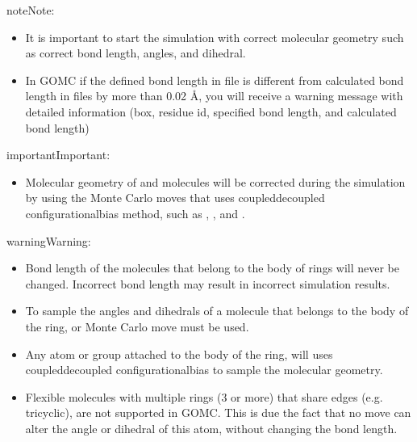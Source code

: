 \documentclass[letterpaper,10pt,english]{sphinxmanual}
\begin{document}
\begin{sphinxadmonition}{note}{Note:}\begin{itemize}
\item {} 
It is important to start the simulation with correct molecular geometry such as correct bond length, angles, and dihedral.

\item {} 
In GOMC if the defined bond length in  file is different from calculated bond length in  files by more than 0.02 \(Å\), you will receive a warning message with detailed information (box, residue id, specified bond length, and calculated bond length)

\end{itemize}
\end{sphinxadmonition}

\begin{sphinxadmonition}{important}{Important:}\begin{itemize}
\item {} 
Molecular geometry of  and  molecules will be corrected during the simulation by using the Monte Carlo moves that uses coupled\sphinxhyphen{}decoupled configurational\sphinxhyphen{}bias method, such as , , and .

\end{itemize}
\end{sphinxadmonition}

\begin{sphinxadmonition}{warning}{Warning:}\begin{itemize}
\item {} 
Bond length of the  molecules that belong to the body of rings will never be changed. Incorrect bond length may result in incorrect simulation results.

\item {} 
To sample the angles and dihedrals of a  molecule that belongs to the body of the ring,  or  Monte Carlo move must be used.

\item {} 
Any atom or group attached to the body of the ring, will uses coupled\sphinxhyphen{}decoupled configurational\sphinxhyphen{}bias to sample the molecular geometry.

\item {} 
Flexible  molecules with multiple rings (3 or more) that share edges (e.g. tricyclic), are not supported in GOMC. This is due the fact that no  move can alter the angle or dihedral of this atom, without changing the bond length.

\end{itemize}
\end{sphinxadmonition}
\end{document}
